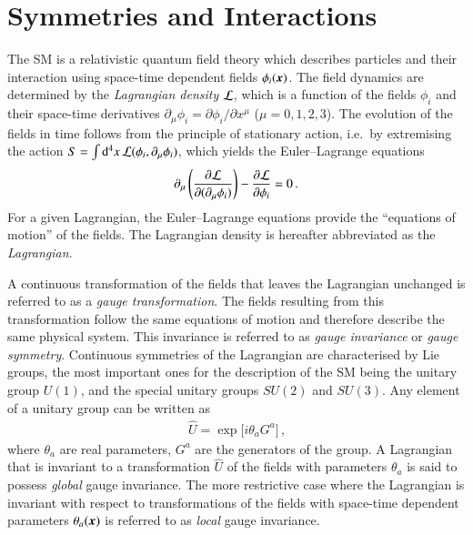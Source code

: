 \section{Symmetries and Interactions}
\label{sec:theo_symmetries_interactions}

The SM is a relativistic quantum field theory which describes particles and
their interaction using space-time dependent fields $\phi_i(\myvec{x})$. The
field dynamics are determined by the \emph{Lagrangian density} $\mathcal{L}$,
which is a function of the fields $\phi_i$ and their space-time derivatives
$\partial_\mu \phi_i = \partial \phi_i / \partial x^\mu$ ($\mu = 0, 1, 2,
3$). The evolution of the fields in time follows from the principle of
stationary action, i.e.\ by extremising the action
$S = \int \mathrm{d}^4x \, \mathcal{L}(\phi_i, \partial_\mu \phi_i)$, which yields
the Euler--Lagrange equations
\begin{align*}
  \partial_{\mu} \left( \frac{\partial \mathcal{L}}{\partial (\partial_{\mu} \phi_i)} \right) - \frac{\partial \mathcal{L}}{\partial \phi_i} = 0 \,\text{.}
\end{align*}
For a given Lagrangian, the Euler--Lagrange equations provide the ``equations of
motion'' of the fields. The Lagrangian density is hereafter abbreviated as the
\emph{Lagrangian}.

A continuous transformation of the fields that leaves the Lagrangian unchanged
is referred to as a \emph{gauge transformation}. The fields resulting from this
transformation follow the same equations of motion and therefore describe the
same physical system. This invariance is referred to as \emph{gauge invariance}
or \emph{gauge symmetry}.
Continuous symmetries of the Lagrangian are characterised by Lie groups, the
most important ones for the description of the SM being the unitary group
$U(1)$, and the special unitary groups $SU(2)$ and $SU(3)$. Any element of a
unitary group can be written as
\begin{align*}
  \hat{U} = \exp\big[ i \theta_a G^a \big] \,\text{,}
\end{align*}
where $\theta_a$ are real parameters, $G^a$ are the generators of the group.
A Lagrangian that is invariant to a transformation $\hat{U}$ of the fields with
parameters $\theta_a$ is said to possess \emph{global} gauge invariance. The
more restrictive case where the Lagrangian is invariant with respect to
transformations of the fields with space-time dependent parameters
$\theta_a(\myvec{x})$ is referred to as \emph{local} gauge invariance.

